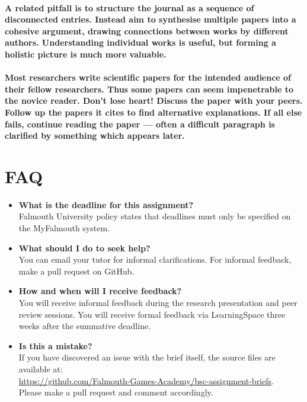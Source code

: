 \documentclass{../../fal_assignment}
\begin{document}
\paragraph{
A related pitfall is to structure the journal as a sequence of disconnected entries.
Instead aim to \textbf{synthesise} multiple papers into a cohesive argument,
drawing connections between works by different authors.
Understanding individual works is useful, but forming a holistic picture is much more valuable.
}

\paragraph{
Most researchers write scientific papers for the intended audience of their fellow researchers.
Thus some papers can seem impenetrable to the novice reader.
Don't lose heart!
Discuss the paper with your peers.
Follow up the papers it cites to find alternative explanations.
If all else fails, continue reading the paper --- often a difficult paragraph is clarified by something which appears later.
}

\section*{FAQ}

\begin{itemize}
	\item 	\textbf{What is the deadline for this assignment?} \\ 
    		Falmouth University policy states that deadlines must only be specified on the MyFalmouth system.
    		
            \item 	\textbf{What should I do to seek help?} \\ 
    		You can email your tutor for informal clarifications. For informal feedback, make a pull request on GitHub. 
    		
            \item 	\textbf{How and when will I receive feedback?} \\ 
            You will receive informal feedback during the research presentation and peer review sessions.
            You will receive formal feedback via LearningSpace three weeks after the summative deadline.
    		
    	\item 	\textbf{Is this a mistake?} \\ 	
    		If you have discovered an issue with the brief itself, the source files are available at: \\
    		\url{https://github.com/Falmouth-Games-Academy/bsc-assignment-briefs}.\\
    		 Please make a pull request and comment accordingly.
\end{itemize}
\end{document}
